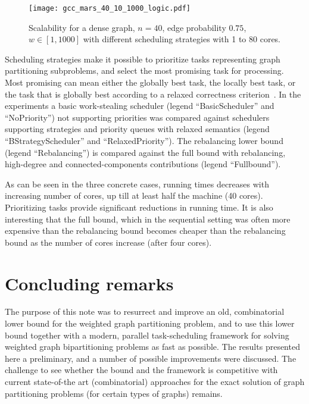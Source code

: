\documentclass[a4paper,11pt]{article}
\begin{document}
\begin{figure}
  \texttt{[image: gcc\_mars\_40\_10\_1000\_logic.pdf]}
\caption{Scalability for a dense graph, $n=40$, edge probability
  $0.75$, $w\in [1,1000]$ with different scheduling strategies
  with 1 to 80 cores.}
\label{fig:large-40}
\end{figure}

Scheduling strategies make it possible to prioritize tasks
representing graph partitioning subproblems, and select the most
promising task for processing. Most promising can mean either the
globally best task, the locally best task, or the task that is
globally best according to a relaxed correctness
criterion~\cite{Wimmer14:diss}. In the experiments a basic
work-stealing scheduler (legend ``BasicScheduler'' and ``NoPriority'')
not supporting priorities was compared against schedulers supporting
strategies and priority queues with relaxed semantics (legend
``BStrategyScheduler'' and ``RelaxedPriority''). The rebalancing lower
bound (legend ``Rebalancing'') is compared against the full bound with
rebalancing, high-degree and connected-components contributions
(legend ``Fullbound'').

As can be seen in the three concrete cases, running times decreases
with increasing number of cores, up till at least half the machine (40
cores). Prioritizing tasks provide significant reductions in running
time. It is also interesting that the full bound, which in the
sequential setting was often more expensive than the rebalancing bound
becomes cheaper than the rebalancing bound as the number of cores
increase (after four cores).

\section{Concluding remarks}

The purpose of this note was to resurrect and improve an old,
combinatorial lower bound for the weighted graph partitioning problem,
and to use this lower bound together with a modern, parallel
task-scheduling framework for solving weighted graph bipartitioning
problems as fast as possible. The results presented here a
preliminary, and a number of possible improvements were discussed. The
challenge to see whether the bound and the framework is competitive
with current state-of-the art (combinatorial) approaches for the exact
solution of graph partitioning problems (for certain types of graphs)
remains.



\end{document}
